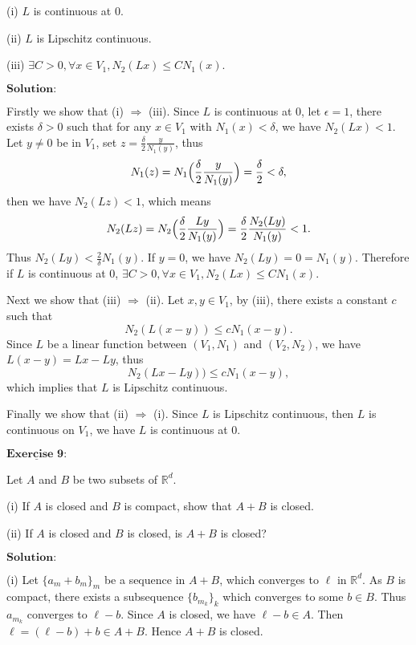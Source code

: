 \documentclass[12pt,a4paper]{ctexart}
\begin{document}
(i) $L$ is continuous at $0$.

(ii) $L$ is Lipschitz continuous.

(iii) $\exists C >0, \forall x \in V_1, N_2(L x) \leq C N_1(x)$.

\vspace{8pt}
$\textbf{Solution:}$

Firstly we show that (i) $\Rightarrow$ (iii). Since $L$ is continuous at $0$, let $\epsilon = 1$, there exists $\delta > 0$ such that for any $x \in V_1$ with $N_1(x) < \delta$, we have $N_2(L x) < 1$. Let $y \neq 0$ be in $V_1$, set $z = \frac{\delta}{2} \frac{y}{N_1(y)}$, thus
$$N_1(z) = N_1 \Big{(} \frac{\delta}{2} \frac{y}{N_1(y)} \Big{)} = \frac{\delta}{2} < \delta ,$$
then we have $N_2(L z) < 1$, which means
$$N_2(L z) = N_2 \Big{(} \frac{\delta}{2} \frac{L y}{N_1(y)} \Big{)} = \frac{\delta}{2} \frac{N_2(L y)}{N_1(y)} < 1.$$
Thus $N_2(L y) < \frac{2}{\delta} N_1(y)$. If $y = 0$, we have $N_2(L y) = 0 = N_1(y)$. Therefore if $L$ is continuous at $0$, $\exists C >0, \forall x \in V_1, N_2(L x) \leq C N_1(x)$.

Next we show that (iii) $\Rightarrow$ (ii). Let $x, y \in V_1$, by (iii), there exists a constant $c$ such that
$$N_2(L(x - y)) \leq c N_1(x-y).$$
Since $L$ be a linear function between $(V_1, N_1)$ and $(V_2, N_2)$, we have $L(x - y) = L x - L y$, thus
$$N_2(L x - L y)) \leq c N_1(x-y),$$
which implies that $L$ is Lipschitz continuous.

Finally we show that (ii) $\Rightarrow$ (i). Since $L$ is Lipschitz continuous, then $L$ is continuous on $V_1$, we have $L$ is continuous at $0$.


\newpage

$\underline{\textbf{Exercise 9:}}$

Let $A$ and $B$ be two subsets of $\mathbb R^d$.

(i) If $A$ is closed and $B$ is compact, show that $A + B$ is closed.

(ii) If $A$ is closed and $B$ is closed, is $A + B$ is closed?

\vspace{8pt}
$\textbf{Solution:}$

(i) Let $\{a_m + b_m \}_{m}$ be a sequence in $A + B$, which converges to $\ell$ in $\mathbb R^d$. As $B$ is compact, there exists a subsequence $\{b_{m_k}\}_{k}$ which converges to some $b \in B$. Thus $a_{m_k}$ converges to $\ell - b$. Since $A$ is closed, we have $\ell - b \in A$. Then $\ell = (\ell - b) + b \in A + B$. Hence $A + B$ is closed.
\end{document}
